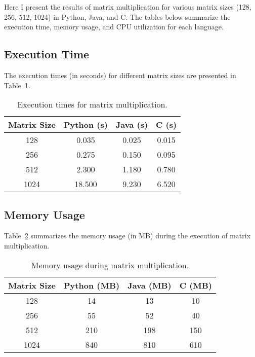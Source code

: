 \documentclass{article}
\begin{document}
Here I present the results of matrix multiplication for various matrix sizes (128, 256, 512, 1024) in Python, Java, and C. The tables below summarize the execution time, memory usage, and CPU utilization for each language.

\subsection{Execution Time}

The execution times (in seconds) for different matrix sizes are presented in Table~\ref{tab:execution_time}.

\begin{table}[h!]
    \centering
    \begin{tabular}{|c|c|c|c|}
    \hline
    Matrix Size & Python (s) & Java (s) & C (s) \\
    \hline
    128  & 0.035  & 0.025  & 0.015  \\
    256  & 0.275  & 0.150  & 0.095  \\
    512  & 2.300  & 1.180  & 0.780  \\
    1024 & 18.500 & 9.230  & 6.520  \\
    \hline
    \end{tabular}
    \caption{Execution times for matrix multiplication.}
    \label{tab:execution_time}
\end{table}

\subsection{Memory Usage}

Table~\ref{tab:memory_usage} summarizes the memory usage (in MB) during the execution of matrix multiplication.

\begin{table}[h!]
    \centering
    \begin{tabular}{|c|c|c|c|}
    \hline
    Matrix Size & Python (MB) & Java (MB) & C (MB) \\
    \hline
    128  & 14  & 13  & 10 \\
    256  & 55  & 52  & 40 \\
    512  & 210 & 198 & 150 \\
    1024 & 840 & 810 & 610 \\
    \hline
    \end{tabular}
    \caption{Memory usage during matrix multiplication.}
    \label{tab:memory_usage}
\end{table}
\end{document}
